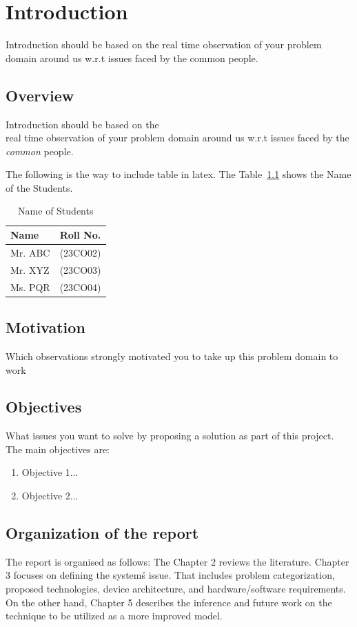 \chapter{Introduction}
Introduction should be based on the real time observation of your problem domain around us w.r.t issues faced by the common people.

\section{Overview}\label{sec1}
Introduction should be based on the \\ real time observation of your problem domain around us w.r.t issues faced by the \textit{common} people.

The following is the way to include table in latex. The  Table~\ref{tab1} shows the Name of the Students.
\begin{table}[!ht] \label{tab1}
	\caption{Name of Students}
	\centering
	\begin{tabular}{|p{5cm}|p{5cm}|}
		\hline
		\textbf{Name}                  & \textbf{Roll No.} \\ \hline
		Mr. ABC        & (23CO02)        \\ \hline
		Mr. XYZ & (23CO03)        \\ \hline
		Ms. PQR    & (23CO04)        \\ \hline
		\end{tabular}
\end{table}


\section{Motivation}\label{sec2}
 Which observations strongly motivated you to take up this problem domain to work
\section{Objectives}\label{sec2}
 What issues you want to solve by proposing a solution as part of this project.\\
The main objectives are:
\begin{enumerate}
	\item Objective 1...	
	\item Objective 2...	
\end{enumerate}

\section{Organization of the report}

The report is organised as follows: The Chapter 2 reviews the literature. Chapter 3 focuses on defining the system\'s issue. That includes problem categorization, proposed technologies, device architecture, and hardware/software requirements. On the other hand, Chapter 5 describes the inference and future work on the technique to be utilized as a more improved model.
